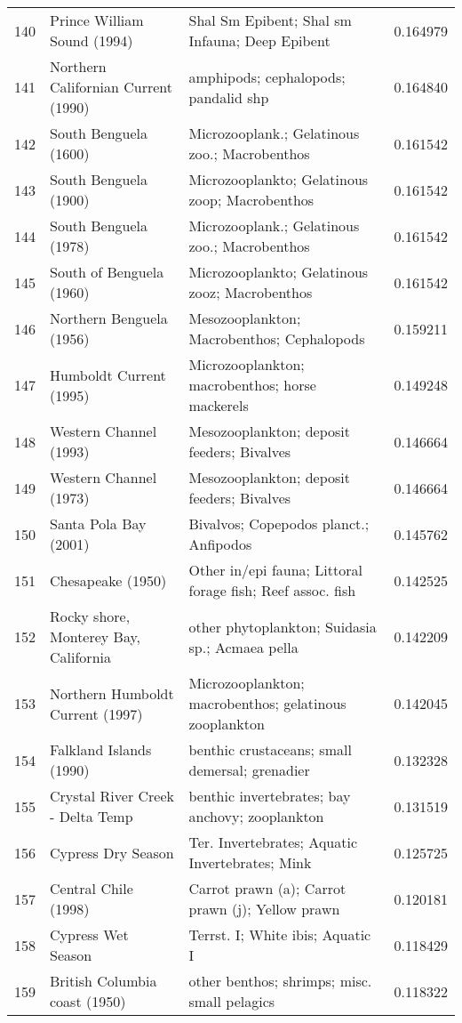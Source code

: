 \begin{tabular}{rllr}
140 & Prince William Sound (1994) & Shal Sm Epibent; Shal sm Infauna; Deep  Epibent & 0.164979 \\
141 & Northern Californian Current (1990) & amphipods; cephalopods; pandalid shp & 0.164840 \\
142 & South Benguela (1600) & Microzooplank.; Gelatinous zoo.; Macrobenthos & 0.161542 \\
143 & South Benguela (1900) & Microzooplankto; Gelatinous zoop; Macrobenthos & 0.161542 \\
144 & South Benguela (1978) & Microzooplank.; Gelatinous zoo.; Macrobenthos & 0.161542 \\
145 & South of Benguela (1960) & Microzooplankto; Gelatinous zooz; Macrobenthos & 0.161542 \\
146 & Northern Benguela (1956) & Mesozooplankton; Macrobenthos; Cephalopods & 0.159211 \\
147 & Humboldt Current (1995) & Microzooplankton; macrobenthos; horse mackerels & 0.149248 \\
148 & Western Channel (1993) & Mesozooplankton; deposit feeders; Bivalves & 0.146664 \\
149 & Western Channel (1973) & Mesozooplankton; deposit feeders; Bivalves & 0.146664 \\
150 & Santa Pola Bay (2001) & Bivalvos; Copepodos planct.; Anfipodos & 0.145762 \\
151 & Chesapeake (1950) & Other in/epi fauna; Littoral forage fish; Reef assoc. fish & 0.142525 \\
152 & Rocky shore, Monterey Bay, California & other phytoplankton; Suidasia sp.; Acmaea pella & 0.142209 \\
153 & Northern Humboldt Current (1997) & Microzooplankton; macrobenthos; gelatinous zooplankton & 0.142045 \\
154 & Falkland Islands (1990) & benthic crustaceans; small demersal; grenadier & 0.132328 \\
155 & Crystal River Creek - Delta Temp & benthic invertebrates; bay anchovy; zooplankton & 0.131519 \\
156 & Cypress Dry Season & Ter. Invertebrates; Aquatic Invertebrates; Mink & 0.125725 \\
157 & Central Chile (1998) & Carrot prawn (a); Carrot prawn (j); Yellow prawn & 0.120181 \\
158 & Cypress Wet Season & Terrst. I; White ibis; Aquatic I & 0.118429 \\
159 & British Columbia coast (1950) & other benthos; shrimps; misc. small pelagics & 0.118322 \\

\end{tabular}
